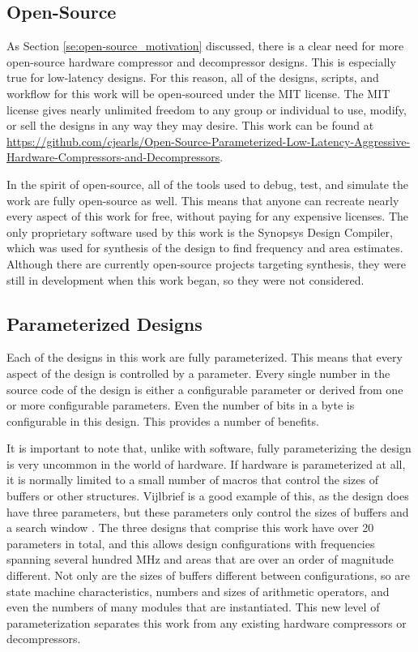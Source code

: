 \documentclass[doublespace,nopageskip]{VTthesis}
\begin{document}
\subsection{Open-Source}\label{ss:open-source}
As Section \ref{se:open-source_motivation} discussed, there is a clear need for more open-source hardware compressor and decompressor designs. This is especially true for low-latency designs. For this reason, all of the designs, scripts, and workflow for this work will be open-sourced under the MIT license. The MIT license gives nearly unlimited freedom to any group or individual to use, modify, or sell the designs in any way they may desire. This work can be found at \href{https://github.com/cjearls/Open-Source-Parameterized-Low-Latency-Aggressive-Hardware-Compressors-and-Decompressors}{https://github.com/cjearls/Open-Source-Parameterized-Low-Latency-Aggressive-Hardware-Compressors-and-Decompressors}.

In the spirit of open-source, all of the tools used to debug, test, and simulate the work are fully open-source as well. This means that anyone can recreate nearly every aspect of this work for free, without paying for any expensive licenses. The only proprietary software used by this work is the Synopsys Design Compiler, which was used for synthesis of the design to find frequency and area estimates. Although there are currently open-source projects targeting synthesis, they were still in development when this work began, so they were not considered.

\subsection{Parameterized Designs}\label{ss:parameterized}
Each of the designs in this work are fully parameterized. This means that every aspect of the design is controlled by a parameter. Every single number in the source code of the design is either a configurable parameter or derived from one or more configurable parameters. Even the number of bits in a byte is configurable in this design. This provides a number of benefits.

It is important to note that, unlike with software, fully parameterizing the design is very uncommon in the world of hardware. If hardware is parameterized at all, it is normally limited to a small number of macros that control the sizes of buffers or other structures. Vijlbrief is a good example of this, as the design does have three parameters, but these parameters only control the sizes of buffers and a search window \cite{hdldeflate}. The three designs that comprise this work have over 20 parameters in total, and this allows design configurations with frequencies spanning several hundred MHz and areas that are over an order of magnitude different. Not only are the sizes of buffers different between configurations, so are state machine characteristics, numbers and sizes of arithmetic operators, and even the numbers of many modules that are instantiated. This new level of parameterization separates this work from any existing hardware compressors or decompressors.
\end{document}
